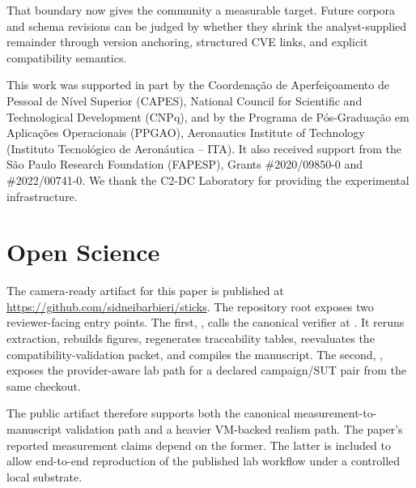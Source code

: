 \documentclass[sigconf]{acmart}
\begin{document}
That boundary now gives the community a measurable target. Future corpora and schema revisions can be judged by whether they shrink the analyst-supplied remainder through version anchoring, structured CVE links, and explicit compatibility semantics.

\begin{acks}
This work was supported in part by the Coordenação de Aperfeiçoamento de Pessoal de Nível Superior (CAPES), National Council for Scientific and Technological Development (CNPq), and by the Programa de Pós-Graduação em Aplicações Operacionais (PPGAO), Aeronautics Institute of Technology (Instituto Tecnológico de Aeronáutica – ITA). It also received support from the São Paulo Research Foundation (FAPESP), Grants \#2020/09850-0 and \#2022/00741-0. We thank the C2-DC Laboratory for providing the experimental infrastructure.
\end{acks}





\appendix

\section{Open Science}\label{sec:open_science}

The camera-ready artifact for this paper is published at \url{https://github.com/sidneibarbieri/sticks}. The repository root exposes two reviewer-facing entry points. The first, , calls the canonical verifier at . It reruns extraction, rebuilds figures, regenerates traceability tables, reevaluates the compatibility-validation packet, and compiles the manuscript. The second, , exposes the provider-aware lab path for a declared campaign/SUT pair from the same checkout.

The public artifact therefore supports both the canonical measurement-to-manuscript validation path and a heavier VM-backed realism path. The paper's reported measurement claims depend on the former. The latter is included to allow end-to-end reproduction of the published lab workflow under a controlled local substrate.
\end{document}
